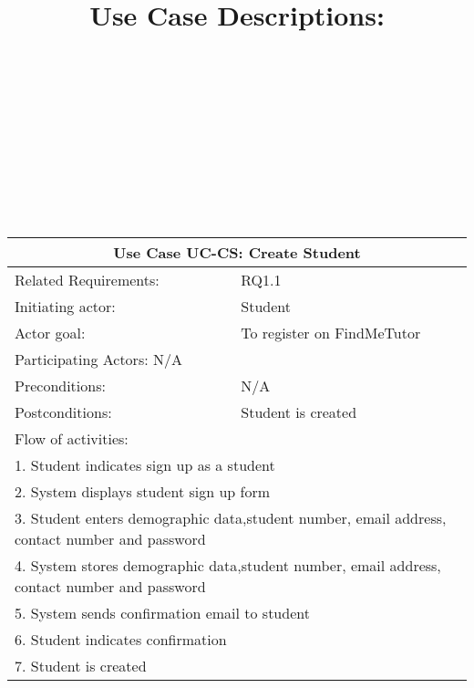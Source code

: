 \documentclass[12pt]{article}
\begin{document}
		{
		\\ \\ \\ \\ \\ \title{\textbf{Use Case Descriptions:}}\\ \\
		}
		{
				
		\centering
		
		
		
		\begin{tabular}{| l | l| }
			\hline\multicolumn{2}{|c|}{ \textbf{Use Case UC-CS: Create Student}} \\ \hline
			Related Requirements: & RQ1.1 \\ \hline
			Initiating actor: & Student \\ \hline
			Actor goal: & To register on FindMeTutor\\ \hline
			Participating Actors: N/A\\ \hline
			Preconditions: & N/A\\ \hline
			Postconditions: & Student is created\\ \hline
			\multicolumn{2}{|l|}{Flow of activities:}\\ \hline
			\multicolumn{2}{|p{15cm}|}{1. Student indicates sign up as a student}\\
			\multicolumn{2}{|p{15cm}|}{2. System displays student sign up form}\\
			\multicolumn{2}{|p{15cm}|}{3. Student enters demographic data,student number, email address, contact number and password}\\		
			\multicolumn{2}{|p{15cm}|}{4. System stores demographic data,student number, email address, contact number and password}\\
			\multicolumn{2}{|l|}{5. System sends confirmation email to student}\\
			\multicolumn{2}{|l|}{6. Student indicates confirmation}	\\
			\multicolumn{2}{|l|}{7. Student is created}
			\\ \hline		
			\end{tabular}
		
		
		
}
\end{document}
